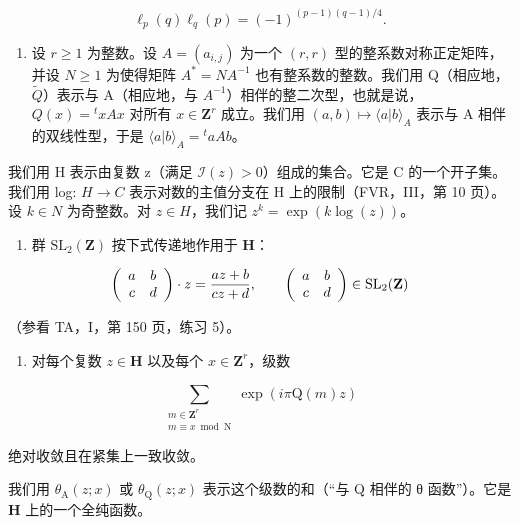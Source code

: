 \[
\ell_ {p} (q) \ell_ {q} (p) = (- 1) ^ {(p - 1) (q - 1) / 4}.
\]

\begin{enumerate}
\def\labelenumi{\arabic{enumi})}
\setcounter{enumi}{60}
\tightlist
\item
  设 \(r \geqslant 1\) 为整数。设 \(A = (a_{i,j})\) 为一个 \((r, r)\) 型的整系数对称正定矩阵，并设 \(N \geqslant 1\) 为使得矩阵 \(A^* = NA^{-1}\) 也有整系数的整数。我们用 Q（相应地，\(\widetilde{Q}\)）表示与 A（相应地，与 \(A^{-1}\)）相伴的整二次型，也就是说，\(Q(x) = {}^t xAx\) 对所有 \(x \in \mathbf{Z}^r\) 成立。我们用 \((a, b) \mapsto \langle a|b \rangle_A\) 表示与 A 相伴的双线性型，于是 \(\langle a|b \rangle_A = {}^t aAb\)。
\end{enumerate}

我们用 H 表示由复数 z（满足 \(\mathcal{I}(z)>0\)）组成的集合。它是 C 的一个开子集。我们用 log: \(H\to C\) 表示对数的主值分支在 H 上的限制（FVR，III，第 10 页）。设 \(k\in N\) 为奇整数。对 \(z\in H\)，我们记 \(z^{k}=\exp(k\log(z))\)。

\begin{enumerate}
\def\labelenumi{\alph{enumi})}
\tightlist
\item
  群 \(\mathrm{SL}_2(\mathbf{Z})\) 按下式传递地作用于 \(\mathbf{H}\)：
\end{enumerate}

\[
\left( \begin{array}{c c} a & b \\ c & d \end{array} \right) \cdot z = \frac {a z + b}{c z + d}, \qquad \left( \begin{array}{c c} a & b \\ c & d \end{array} \right) \in \mathrm{SL} _ {2} (\mathbf {Z})
\]

  （参看 TA，I，第 150 页，练习 5）。

\begin{enumerate}
\def\labelenumi{\alph{enumi})}
\setcounter{enumi}{1}
\tightlist
\item
  对每个复数 \(z \in \mathbf{H}\) 以及每个 \(x \in \mathbf{Z}^r\)，级数
\end{enumerate}

\[
\sum_{\substack{m\in \mathbf{Z}^{r}\\ m\equiv x\bmod \mathrm{N}}}\exp (i\pi \mathrm{Q}(m)z)
\]

绝对收敛且在紧集上一致收敛。

我们用 \(\theta_{\mathrm{A}}(z;x)\) 或 \(\theta_{\mathrm{Q}}(z;x)\) 表示这个级数的和（“与 Q 相伴的 θ 函数”）。它是 \(\mathbf{H}\) 上的一个全纯函数。

